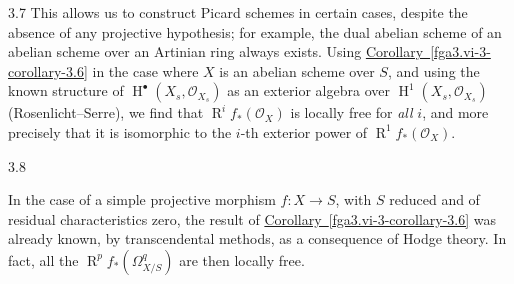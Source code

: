 \begin{remark}{3.7}
    This allows us to construct Picard schemes in certain cases, despite the absence of any projective hypothesis;
    for example, the dual abelian scheme of an abelian scheme over an Artinian ring always exists.
    Using \hyperref[fga3.vi-3-corollary-3.6]{Corollary~\ref*{fga3.vi-3-corollary-3.6}} in the case where \(X\) is an abelian scheme over \(S\), and using the known structure of \(\operatorname {H}^\bullet (X_s,\mathcal {O}_{X_s})\) as an exterior algebra over \(\operatorname {H}^1(X_s,\mathcal {O}_{X_s})\) (Rosenlicht–Serre), we find that \(\operatorname {R}^if_*(\mathcal {O}_X)\) is locally free for \emph{all} \(i\), and more precisely that it is isomorphic to the \(i\)-th exterior power of \(\operatorname {R}^1f_*(\mathcal {O}_X)\).\end{remark}\begin{remark}{3.8}\label{fga3.vi-3-remark-3.8}\skipsinglepar\par{}In the case of a simple projective morphism \(f\colon  X\to  S\), with \(S\) reduced and of residual characteristics zero, the result of \hyperref[fga3.vi-3-corollary-3.6]{Corollary~\ref*{fga3.vi-3-corollary-3.6}} was already known, by transcendental methods, as a consequence of Hodge theory.
    In fact, all the \(\operatorname {R}^pf_*(\Omega _{X/S}^q)\) are then locally free.
    

\end{remark}
